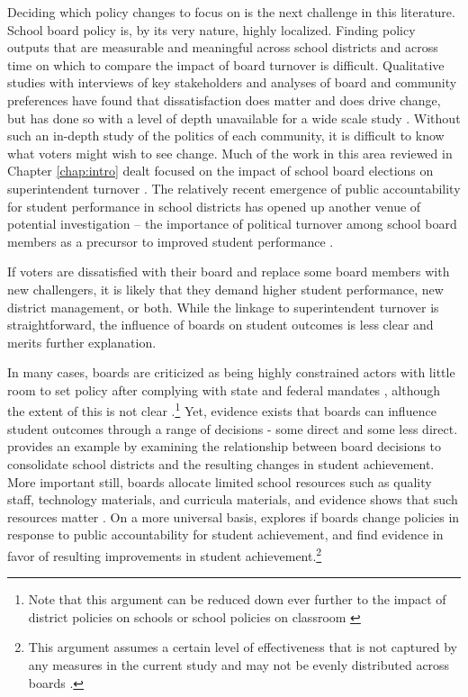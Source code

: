 Deciding which policy changes to focus on is the next challenge in this literature. 
School board policy is, by its very nature, highly localized. Finding policy 
outputs that are measurable and meaningful across school districts and across 
time on which to compare the impact of board turnover is difficult. Qualitative studies 
with interviews of key stakeholders and analyses of board and community preferences 
have found that dissatisfaction does matter and does drive change, but has done 
so with a level of depth unavailable for a wide scale study 
\citep{RefWorks:234,RefWorks:254,RefWorks:256,RefWorks:235}. Without such an 
in-depth study of the politics of each community, it is difficult to know 
what voters might wish to see change. Much of the work in this area reviewed in Chapter \ref{chap:intro} 
dealt focused on the impact of school board elections on superintendent
turnover \citep{RefWorks:297,RefWorks:271, RefWorks:351,
RefWorks:339,RefWorks:340,RefWorks:243}. The relatively recent emergence of 
public accountability for student performance in school districts has opened 
up another venue of potential investigation -- the importance of political 
turnover among school board members as a precursor to improved student 
performance \citep{RefWorks:311}. 

If voters are dissatisfied with their board and replace 
some board members with new challengers, it is likely that they demand higher student
performance, new district management, or both. While the linkage to superintendent 
turnover is straightforward, the influence of boards on student outcomes is less 
clear and merits further explanation. 

In many cases, boards are criticized as being highly constrained actors with 
little room to set policy after complying with state and federal mandates 
\citep{RefWorks:316}, although the extent of this is not clear \citep{RefWorks:223}.\footnote{Note that this argument can be reduced down ever further to the impact 
of district policies on schools or school policies on classroom \citep{RefWorks:255}}
Yet, evidence exists that boards can influence student outcomes through a range 
of decisions - some direct and some less direct.\citet{RefWorks:210} provides 
an example by examining the relationship between board decisions to consolidate 
school districts and the resulting changes in student achievement. More 
important still, boards allocate limited school resources such as quality staff, 
technology materials, and curricula materials, and evidence shows that such 
resources matter \citep{RefWorks:183}. On a more 
universal basis, \citet{RefWorks:214} explores if boards change policies in 
response to public accountability for student achievement, and find evidence in 
favor of resulting improvements in student achievement.\footnote{This argument 
assumes a certain level of effectiveness that is not captured by any measures in 
the current study and may not be evenly distributed across boards 
\citep{RefWorks:237,RefWorks:261}.}

